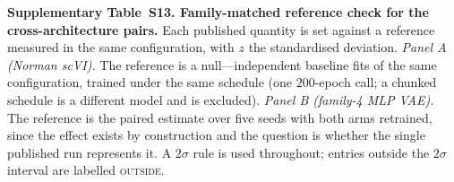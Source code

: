 \documentclass[11pt,a4paper]{article}
\begin{document}
\begin{table}[ht]
\centering
\caption*{\textbf{Supplementary Table~S13. Family-matched reference check for the cross-architecture pairs.} Each published quantity is set against a reference measured in the same configuration, with $z$ the standardised deviation. \emph{Panel A (Norman scVI).} The reference is a null---independent baseline fits of the same configuration, trained under the same schedule (one $200$-epoch call; a chunked schedule is a different model and is excluded). \emph{Panel B (family-4 MLP VAE).} The reference is the paired estimate over five seeds with both arms retrained, since the effect exists by construction and the question is whether the single published run represents it. A $2\sigma$ rule is used throughout; entries outside the $2\sigma$ interval are labelled \textsc{outside}.}
\label{tab:norman_null}
\footnotesize
\setlength{\tabcolsep}{3pt}

\end{table}
\end{document}
